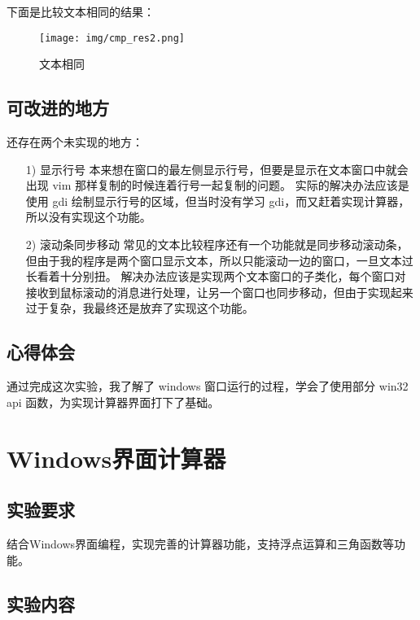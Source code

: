 \documentclass[proposal-report]{bitart}
\begin{document}
下面是比较文本相同的结果：

\begin{figure}[H]
  \centering
  \texttt{[image: img/cmp\_res2.png]}
  \caption{文本相同}
\end{figure}

\subsection{可改进的地方}

还存在两个未实现的地方：

\begin{itemize}
  \item [1)] 显示行号
    \subitem 本来想在窗口的最左侧显示行号，但要是显示在文本窗口中就会出现 vim 那样复制的时候连着行号一起复制的问题。
    \subitem 实际的解决办法应该是使用 gdi 绘制显示行号的区域，但当时没有学习 gdi，而又赶着实现计算器，所以没有实现这个功能。
  \item [2)]  滚动条同步移动
    \subitem 常见的文本比较程序还有一个功能就是同步移动滚动条，但由于我的程序是两个窗口显示文本，所以只能滚动一边的窗口，一旦文本过长看着十分别扭。
    \subitem 解决办法应该是实现两个文本窗口的子类化，每个窗口对接收到鼠标滚动的消息进行处理，让另一个窗口也同步移动，但由于实现起来过于复杂，我最终还是放弃了实现这个功能。
    
\end{itemize}

\subsection{心得体会}

通过完成这次实验，我了解了 windows 窗口运行的过程，学会了使用部分 win32 api 函数，为实现计算器界面打下了基础。


\section{Windows界面计算器}

\subsection{实验要求}

结合Windows界面编程，实现完善的计算器功能，支持浮点运算和三角函数等功能。

\subsection{实验内容}
\end{document}
